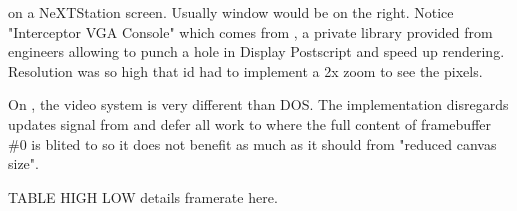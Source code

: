 \doom{}on a NeXTStation screen. Usually  window would be on the right. Notice "Interceptor VGA Console" which comes from , a private library provided from \NeXT engineers allowing to punch a hole in Display Postscript and speed up rendering. Resolution was so high that id had to implement a 2x zoom to see the pixels.\\
\par
{}

\vspace{-4mm}
On \NeXT, the video system is very different than DOS. The implementation disregards updates signal from  and defer all work to  where the full content of framebuffer \#0 is blited to  so it does not benefit as much as it should from "reduced canvas size".\\
\par
TABLE HIGH LOW details framerate here.
